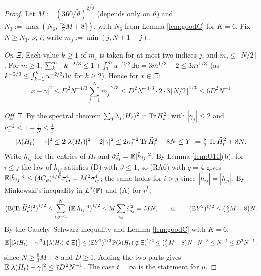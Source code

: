 \begin{proof}
Let $M:=(360/\tilde\vartheta)^{2/\tilde\vartheta}$ (depends only on $\vartheta$) and $N_3:=\max(N_6,\lceil\frac83M+8\rceil)$, with $N_6$ from Lemma \ref{lem:goodC} for $K=6$. Fix $N\ge N_3$, $\nu$, $t$; write $m_j:=\min(j,N+1-j)$.

\emph{On $\Xi$.} Each value $k\ge1$ of $m_j$ is taken for at most two indices $j$, and $m_j\le\lceil N/2\rceil$. For $m\ge1$, $\sum_{k=1}^mk^{-2/3}\le1+\int_1^mu^{-2/3}\rd u=3m^{1/3}-2\le3m^{1/3}$ (as $k^{-2/3}\le\int_{k-1}^ku^{-2/3}\rd u$ for $k\ge2$). Hence for $x\in\Xi$:
\[
|x-\gamma|^2\le D^2N^{-4/3}\sum_{j=1}^Nm_j^{-2/3}\le D^2N^{-4/3}\cdot2\cdot3\lceil N/2\rceil^{1/3}\le6D^2N^{-1}.
\]

\emph{Off $\Xi$.} By the spectral theorem $\sum_j\lambda_j(H_t)^2=\Tr H_t^2$; with $|\gamma_j|\le2$ and $\kappa_t^{-2}\le1+\frac1N\le\frac43$,
\[
|\lambda(H_t)-\gamma|^2\le2|\lambda(H_t)|^2+2|\gamma|^2\le2\kappa_t^{-2}\Tr\widetilde H_t^2+8N\le Y:=\tfrac83\Tr\widetilde H_t^2+8N .
\]
Write $\tilde h_{ij}$ for the entries of $\widetilde H_t$ and $\tilde\sigma_{ij}^2=\E|\tilde h_{ij}|^2$. By Lemma \ref{lem:U11}(b), for $i\le j$ the law of $\tilde h_{ij}$ satisfies (D) with $\tilde\vartheta\le1$, so (RA6) with $q=4$ gives $\E|\tilde h_{ij}|^4\le(4C_{\tilde\vartheta})^{4/\tilde\vartheta}\tilde\sigma_{ij}^4=M^2\tilde\sigma_{ij}^4$; the same holds for $i>j$ since $|\tilde h_{ij}|=|\tilde h_{ji}|$.
By Minkowski's inequality in $L^2(\P)$ and (A) for $\tilde\nu^t$,
\[
\big(\E(\Tr\widetilde H_t^2)^2\big)^{1/2}\le\sum_{i,j=1}^N\big(\E|\tilde h_{ij}|^4\big)^{1/2}\le M\sum_{i,j}\tilde\sigma_{ij}^2=MN,\qquad\text{so}\qquad(\E Y^2)^{1/2}\le\big(\tfrac83M+8\big)N .
\]
By the Cauchy--Schwarz inequality and Lemma \ref{lem:goodC} with $K=6$,
\[
\E\big[|\lambda(H_t)-\gamma|^2\mathbf 1\{\lambda(H_t)\notin\Xi\}\big]\le(\E Y^2)^{1/2}\,\P(\lambda(H_t)\notin\Xi)^{1/2}\le\big(\tfrac83M+8\big)N\cdot N^{-3}\le N^{-1}\le D^2N^{-1},
\]
since $N\ge\frac83M+8$ and $D\ge1$. Adding the two parts gives $\E|\lambda(H_t)-\gamma|^2\le7D^2N^{-1}$. The case $t=\infty$ is the statement for $\mu$.
\end{proof}

